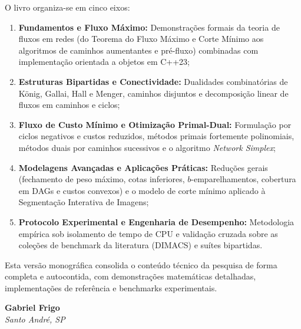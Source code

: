 O livro organiza-se em cinco eixos:
\begin{enumerate}[leftmargin=1.5em, itemsep=0.4em]
    \item \textbf{Fundamentos e Fluxo Máximo:} Demonstrações formais da teoria de fluxos em redes (do Teorema do Fluxo Máximo e Corte Mínimo aos algoritmos de caminhos aumentantes e pré-fluxo) combinadas com implementação orientada a objetos em C++23;
    \item \textbf{Estruturas Bipartidas e Conectividade:} Dualidades combinatórias de König, Gallai, Hall e Menger, caminhos disjuntos e decomposição linear de fluxos em caminhos e ciclos;
    \item \textbf{Fluxo de Custo Mínimo e Otimização Primal-Dual:} Formulação por ciclos negativos e custos reduzidos, métodos primais fortemente polinomiais, métodos duais por caminhos sucessivos e o algoritmo \textit{Network Simplex};
    \item \textbf{Modelagens Avançadas e Aplicações Práticas:} Reduções gerais (fechamento de peso máximo, cotas inferiores, $b$-emparelhamentos, cobertura em DAGs e custos convexos) e o modelo de corte mínimo aplicado à Segmentação Interativa de Imagens;
    \item \textbf{Protocolo Experimental e Engenharia de Desempenho:} Metodologia empírica sob isolamento de tempo de CPU e validação cruzada sobre as coleções de benchmark da literatura (DIMACS) e suítes bipartidas.
\end{enumerate}

Esta versão monográfica consolida o conteúdo técnico da pesquisa de forma completa e autocontida, com demonstrações matemáticas detalhadas, implementações de referência e benchmarks experimentais.

\vspace{1cm}
\begin{flushright}
    \textbf{Gabriel Frigo}\\
    \textit{Santo André, SP}
\end{flushright}

\newpage
\tableofcontents
\newpage

